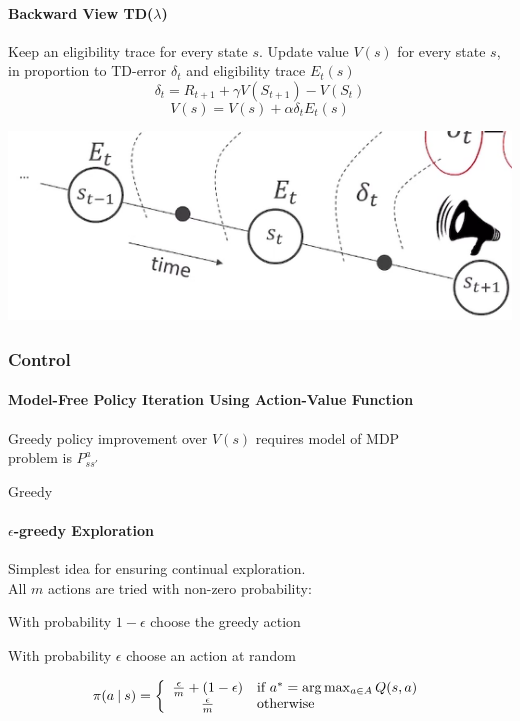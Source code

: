 \documentclass[10pt]{report}
\begin{document}
\paragraph{Backward View TD($\lambda$)} Keep an eligibility trace for every state $s$. Update value $V(s)$ for every state $s$, in proportion to TD-error $\delta_t$ and eligibility trace $E_t(s)$
$$\delta_t = R_{t+1} + \gamma V(S_{t+1}) - V(S_t)$$
$$V(s) = V(s) + \alpha\delta_t E_t(s)$$
\begin{center}
	\includegraphics[scale=0.5]{171.png}
\end{center}
\subsubsection{Control}
\paragraph{Model-Free Policy Iteration Using Action-Value Function}
\begin{list}{}{}
	\item Greedy policy improvement over $V(s)$ requires model of MDP
	$$ $$ %
	problem is $P_{ss'}^a$
	\item Greedy %
\end{list}
\paragraph{$\epsilon$-greedy Exploration} Simplest idea for ensuring continual exploration.\\
All $m$ actions are tried with non-zero probability:\begin{list}{}{}
	\item With probability $1-\epsilon$ choose the greedy action
	\item With probability $\epsilon$ choose an action at random
\end{list}
$$\pi(a\:|\:s)= \left\{\begin{array}{c l}
\frac{\epsilon}{m}+(1-\epsilon)&\hbox{if }a^*=\arg\max_{a\in A}Q(s,a)\\
\frac{\epsilon}{m}&\hbox{otherwise}
\end{array}\right.$$
\end{document}
